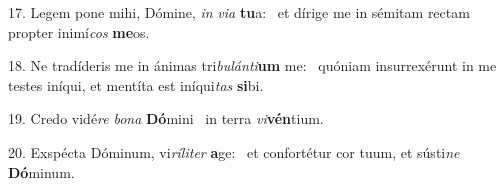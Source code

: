 17. Legem pone mihi, Dómine, \textit{in} \textit{vi}\textit{a} \textbf{tu}a: \ast\  et dírige me in sémitam rectam propter inimí\textit{cos} \textbf{me}os.\

18. Ne tradíderis me in ánimas tri\textit{bu}\textit{lán}\textit{ti}\textbf{um} me: \ast\  quóniam insurrexérunt in me testes iníqui, et mentíta est iníqui\textit{tas} \textbf{si}bi.\

19. Credo vidé\textit{re} \textit{bo}\textit{na} \textbf{Dó}mini \ast\  in terra \textit{vi}\textbf{vén}tium.\

20. Exspécta Dóminum, vi\textit{rí}\textit{li}\textit{ter} \textbf{a}ge: \ast\  et confortétur cor tuum, et sústi\textit{ne} \textbf{Dó}minum.\

